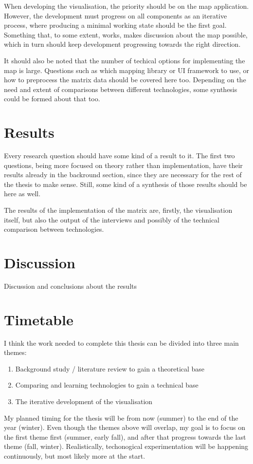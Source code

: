 \documentclass[12pt]{article}
\begin{document}
When developing the visualisation, the priority should be on the map application.
However, the development must progress on all components as an iterative process,
where producing a minimal working state should be the first goal.
Something that, to some extent, works, makes discussion about the map possible,
which in turn should keep development progressing towards the right direction.

It should also be noted that the number of techical options for implementing the map is large.
Questions such as which mapping library or UI framework to use,
or how to preprocess the matrix data should be covered here too.
Depending on the need and extent of comparisons between different technologies,
some synthesis could be formed about that too.

\section{Results}

Every research question should have some kind of a result to it.
The first two questions, being more focused on theory rather than implementation,
have their results already in the backround section,
since they are necessary for the rest of the thesis to make sense.
Still, some kind of a synthesis of those results should be here as well.

The results of the implementation of the matrix are, firstly, the visualisation itself,
but also the output of the interviews
and possibly of the technical comparison between technologies.

\section{Discussion}

Discussion and conclusions about the results

\section{Timetable}

I think the work needed to complete this thesis can be divided into three main themes:

\begin{enumerate}
	\item Background study / literature review to gain a theoretical base
	\item Comparing and learning technologies to gain a technical base
	\item The iterative development of the visualisation
\end{enumerate}

My planned timing for the thesis will be from now (summer) to the end of the year (winter).
Even though the themes above will overlap,
my goal is to focus on the first theme first (summer, early fall),
and after that progress towards the last theme (fall, winter).
Realistically, techonogical experimentation will be happening continuously,
but most likely more at the start.

\printbibliography
\end{document}
